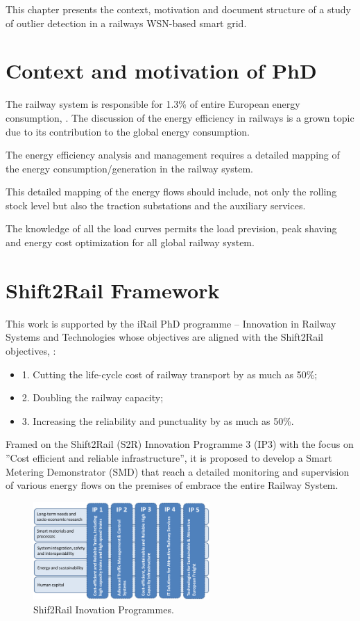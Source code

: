 This chapter presents the context, motivation and document structure of a study of outlier detection in a railways WSN-based smart grid. 

\section{Context and motivation of PhD}

The railway system is responsible for 1.3\% of entire European energy consumption, \cite{iea-uic2016}. 
The discussion of the energy efficiency in railways is a grown topic due to its contribution to the global energy consumption.

The energy efficiency analysis and management requires a detailed mapping of the energy consumption/generation in the railway system. 

This detailed mapping of the energy flows should include, not only the rolling stock level but also the traction substations and the auxiliary services.

The knowledge of all the load curves permits the load prevision, peak shaving and energy cost optimization for all global railway system.


\section{Shift2Rail Framework}

This work is supported by the iRail PhD programme – Innovation in Railway Systems and Technologies whose objectives are aligned with the Shift2Rail objectives, \cite{shift2rail2015}: 

\begin{itemize}
		\setlength\itemsep{-0.5em}
		\item 1. Cutting the life-cycle cost of railway transport by as much as 50\%;
		\item 2. Doubling the railway capacity;
		\item 3. Increasing the reliability and punctuality by as much as 50\%.
\end{itemize}


Framed on the Shift2Rail (S2R) Innovation Programme 3 (IP3) with the focus on ”Cost efficient and reliable infrastructure”, it is proposed to develop a Smart Metering Demonstrator (SMD) that reach a detailed monitoring and supervision of various energy flows on the premises of embrace the entire Railway System.

\begin{figure}[h!]
	\centering
	\includegraphics[width=0.60\textwidth,keepaspectratio]{figures/IPs}
	\caption{Shif2Rail Inovation Programmes. }
	\label{fig:ips}
\end{figure}

